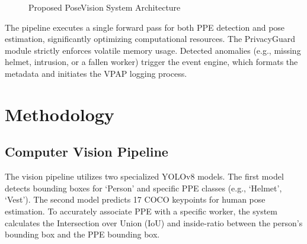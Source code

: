 \documentclass[conference]{IEEEtran}
\begin{document}
\begin{figure}[htbp]
  \centering
  \caption{Proposed PoseVision System Architecture}
  \label{fig:architecture}
\end{figure}

The pipeline executes a single forward pass for both PPE detection and pose estimation, significantly optimizing computational resources. The PrivacyGuard module strictly enforces volatile memory usage. Detected anomalies (e.g., missing helmet, intrusion, or a fallen worker) trigger the event engine, which formats the metadata and initiates the VPAP logging process.

\section{Methodology}

\subsection{Computer Vision Pipeline}
The vision pipeline utilizes two specialized YOLOv8 \cite{jocher2023yolo} models. The first model detects bounding boxes for `Person' and specific PPE classes (e.g., `Helmet', `Vest'). The second model predicts 17 COCO keypoints for human pose estimation.
To accurately associate PPE with a specific worker, the system calculates the Intersection over Union (IoU) and inside-ratio between the person's bounding box and the PPE bounding box. 
\end{document}
